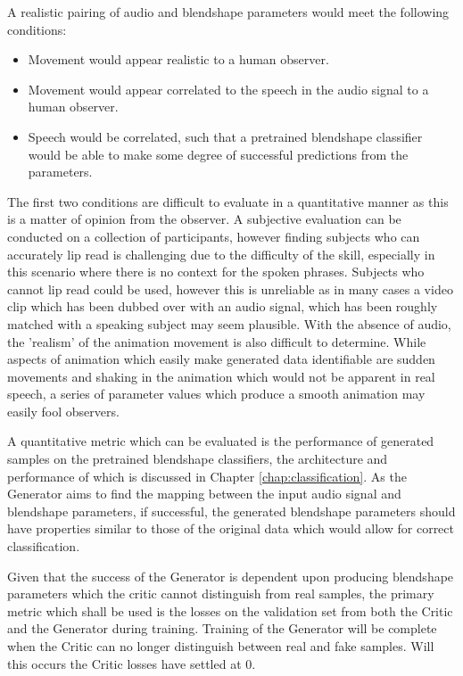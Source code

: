 A realistic pairing of audio and blendshape parameters would meet the following conditions:
\begin{itemize}
    \item Movement would appear realistic to a human observer.
    \item Movement would appear correlated to the speech in the audio signal to a human observer.
    \item Speech would be correlated, such that a pretrained blendshape classifier would be able to make some degree of successful predictions from the parameters.
\end{itemize}

The first two conditions are difficult to evaluate in a quantitative manner as this is a matter of opinion from the observer.
A subjective evaluation can be conducted on a collection of participants, however finding subjects who can accurately lip read is challenging due to the difficulty of the skill, especially in this scenario where there is no context for the spoken phrases.
Subjects who cannot lip read could be used, however this is unreliable as in many cases a video clip which has been dubbed over with an audio signal, which has been roughly matched with a speaking subject may seem plausible.
With the absence of audio, the 'realism' of the animation movement is also difficult to determine.
While aspects of animation which easily make generated data identifiable are sudden movements and shaking in the animation which would not be apparent in real speech, a series of parameter values which produce a smooth animation may easily fool observers.

A quantitative metric which can be evaluated is the performance of generated samples on the pretrained blendshape classifiers, the architecture and performance of which is discussed in Chapter \ref{chap:classification}.
As the Generator aims to find the mapping between the input audio signal and blendshape parameters, if successful, the generated blendshape parameters should have properties similar to those of the original data which would allow for correct classification.

Given that the success of the Generator is dependent upon producing blendshape parameters which the critic cannot distinguish from real samples, the primary metric which shall be used is the losses on the validation set from both the Critic and the Generator during training.
Training of the Generator will be complete when the Critic can no longer distinguish between real and fake samples.
Will this occurs the Critic losses have settled at 0.

